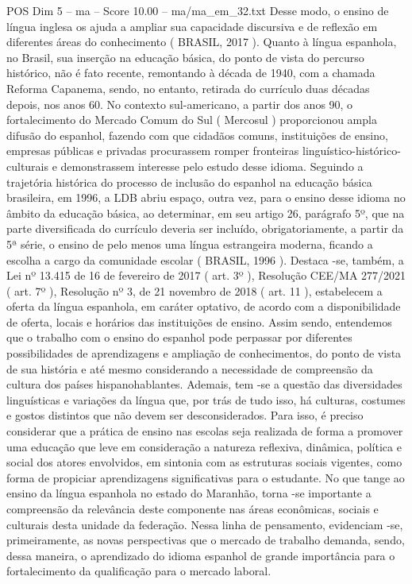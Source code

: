 \begin{textsample}{POS Dim 5 – ma – Score 10.00 – ma/ma\_em\_32.txt}
Desse modo, o ensino de língua inglesa os ajuda a ampliar sua capacidade discursiva e de reflexão em diferentes áreas do conhecimento ( BRASIL, 2017 ).
Quanto à língua espanhola, no Brasil, sua inserção na educação básica, do ponto de vista do percurso histórico, não é fato recente, remontando à década de 1940, com a chamada Reforma Capanema, sendo, no entanto, retirada do currículo duas décadas depois, nos anos 60.
No contexto sul-americano, a partir dos anos 90, o fortalecimento do Mercado Comum do Sul ( Mercosul ) proporcionou ampla difusão do espanhol, fazendo com que cidadãos comuns, instituições de ensino, empresas públicas e privadas procurassem romper fronteiras linguístico-histórico-culturais e demonstrassem interesse pelo estudo desse idioma.
Seguindo a trajetória histórica do processo de inclusão do espanhol na educação básica brasileira, em 1996, a LDB abriu espaço, outra vez, para o ensino desse idioma no âmbito da educação básica, ao determinar, em seu artigo 26, parágrafo 5º, que na parte diversificada do currículo deveria ser incluído, obrigatoriamente, a partir da 5ª série, o ensino de pelo menos uma língua estrangeira moderna, ficando a escolha a cargo da comunidade escolar ( BRASIL, 1996 ).
Destaca -se, também, a Lei nº 13.415 de 16 de fevereiro de 2017 ( art. 3º ), Resolução CEE/MA 277/2021 ( art. 7º ), Resolução nº 3, de 21 novembro de 2018 ( art. 11 ), estabelecem a oferta da língua espanhola, em caráter optativo, de acordo com a disponibilidade de oferta, locais e horários das instituições de ensino.
Assim sendo, entendemos que o trabalho com o ensino do espanhol pode perpassar por diferentes possibilidades de aprendizagens e ampliação de conhecimentos, do ponto de vista de sua história e até mesmo considerando a necessidade de compreensão da cultura dos países hispanohablantes.
Ademais, tem -se a questão das diversidades linguísticas e variações da língua que, por trás de tudo isso, há culturas, costumes e gostos distintos que não devem ser desconsiderados.
Para isso, é preciso considerar que a prática de ensino nas escolas seja realizada de forma a promover uma educação que leve em consideração a natureza reflexiva, dinâmica, política e social dos atores envolvidos, em sintonia com as estruturas sociais vigentes, como forma de propiciar aprendizagens significativas para o estudante.
No que tange ao ensino da língua espanhola no estado do Maranhão, torna -se importante a compreensão da relevância deste componente nas áreas econômicas, sociais e culturais desta unidade da federação.
Nessa linha de pensamento, evidenciam -se, primeiramente, as novas perspectivas que o mercado de trabalho demanda, sendo, dessa maneira, o aprendizado do idioma espanhol de grande importância para o fortalecimento da qualificação para o mercado laboral.

\end{textsample}
